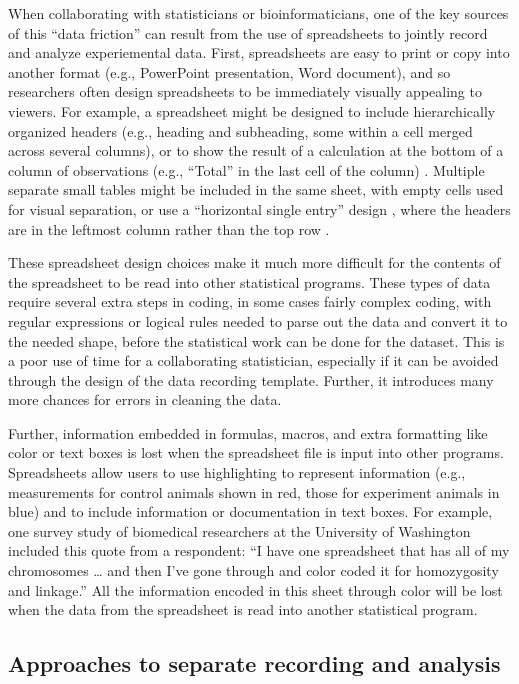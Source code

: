 \documentclass[]{tufte-book}
\begin{document}
When collaborating with statisticians or bioinformaticians, one of the key
sources of this ``data friction'' can result from the use of spreadsheets to
jointly record and analyze experiemental data. First, spreadsheets are easy to
print or copy into another format (e.g., PowerPoint presentation, Word
document), and so researchers often design spreadsheets to be immediately
visually appealing to viewers. For example, a spreadsheet might be designed to
include hierarchically organized headers (e.g., heading and subheading, some
within a cell merged across several columns), or to show the result of a
calculation at the bottom of a column of observations (e.g., ``Total'' in the last
cell of the column) \citep{teixeira2016emergence}. Multiple separate small tables
might be included in the same sheet, with empty cells used for visual
separation, or use a ``horizontal single entry'' design , where the headers are in
the leftmost column rather than the top row \citep{teixeira2016emergence}.

These spreadsheet design choices make it much more difficult for the contents of
the spreadsheet to be read into other statistical programs. These types of data
require several extra steps in coding, in some cases fairly complex coding, with
regular expressions or logical rules needed to parse out the data and convert it
to the needed shape, before the statistical work can be done for the dataset.
This is a poor use of time for a collaborating statistician, especially if it
can be avoided through the design of the data recording template. Further, it
introduces many more chances for errors in cleaning the data.

Further, information embedded in formulas, macros, and extra formatting like
color or text boxes is lost when the spreadsheet file is input into other
programs. Spreadsheets allow users to use highlighting to represent information
(e.g., measurements for control animals shown in red, those for experiment
animals in blue) and to include information or documentation in text boxes. For
example, one survey study of biomedical researchers at the University of
Washington included this quote from a respondent: ``I have one spreadsheet that
has all of my chromosomes \ldots{} and then I've gone through and color coded it for
homozygosity and linkage.'' \citep{anderson2007issues} All the information encoded in
this sheet through color will be lost when the data from the spreadsheet is read
into another statistical program.

\subsection{Approaches to separate recording and analysis}\label{approaches-to-separate-recording-and-analysis}
\end{document}

